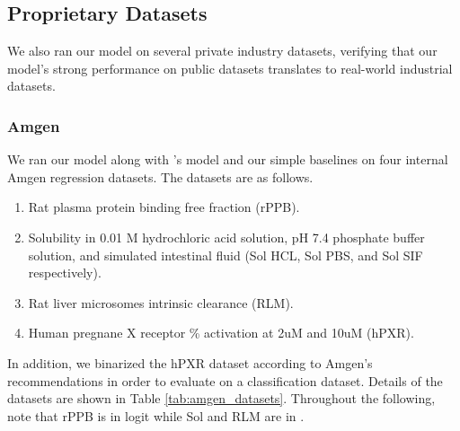 \documentclass[journal=jcisd8,manuscript=article]{achemso}
\begin{document}
\subsection{Proprietary Datasets}

We also ran our model on several private industry datasets, verifying that our model's strong performance on public datasets translates to real-world industrial datasets. 

\subsubsection{Amgen}

We ran our model along with \citeauthor{mayr2018chembl}'s\cite{mayr2018chembl} model and our simple baselines on four internal Amgen regression datasets. The datasets are as follows. 

\begin{enumerate}
    \item Rat plasma protein binding free fraction (rPPB).
    \item Solubility in 0.01 M hydrochloric acid solution, pH 7.4 phosphate buffer solution, and simulated intestinal fluid (Sol HCL, Sol PBS, and Sol SIF respectively).
    \item Rat liver microsomes intrinsic clearance (RLM).
    \item Human pregnane X receptor \% activation at 2uM and 10uM (hPXR).
\end{enumerate}

In addition, we binarized the hPXR dataset according to Amgen's recommendations in order to evaluate on a classification dataset. Details of the datasets are shown in Table \ref{tab:amgen_datasets}. Throughout the following, note that rPPB is in logit while Sol and RLM are in .

\FloatBarrier

\begin{table}[]
\caption{Details on internal Amgen datasets. Note: ADME stands for absorption, distribution, metabolism, and excretion.}
\label{tab:amgen_datasets}
\end{table}
\end{document}
